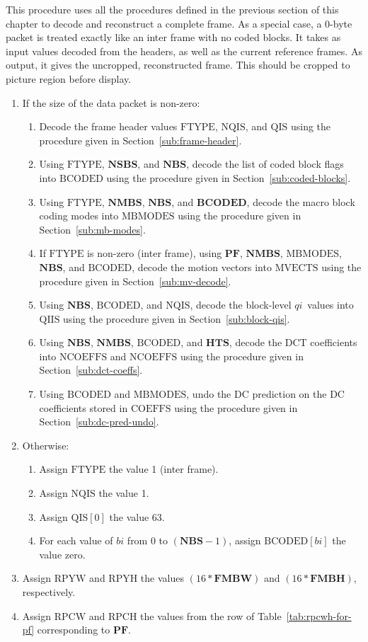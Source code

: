 \documentclass[9pt,letterpaper]{book}
\newcommand{\idx}[1]{{\ensuremath{\mathit{#1}}}}
\newcommand{\qi}{\idx{qi}}
\newcommand{\bi}{\idx{bi}}
\newcommand{\bitvar}[1]{\ensuremath{\mathbf{\bm{#1}}}}
\newcommand{\locvar}[1]{\ensuremath{\mathrm{#1}}}
\numberwithin{equation}{chapter}
\numberwithin{figure}{chapter}
\numberwithin{table}{chapter}
\begin{document}
This procedure uses all the procedures defined in the previous section of this
 chapter to decode and reconstruct a complete frame.
As a special case, a 0-byte packet is treated exactly like an inter frame with
 no coded blocks.
It takes as input values decoded from the headers, as well as the current
 reference frames.
As output, it gives the uncropped, reconstructed frame.
This should be cropped to picture region before display.

\begin{enumerate}
\item
If the size of the data packet is non-zero:
\begin{enumerate}
\item
Decode the frame header values \locvar{FTYPE}, \locvar{NQIS}, and \locvar{QIS}
 using the procedure given in Section~\ref{sub:frame-header}.
\item
Using \locvar{FTYPE}, \bitvar{NSBS}, and \bitvar{NBS}, decode the list of coded
 block flags into \locvar{BCODED} using the procedure given in
 Section~\ref{sub:coded-blocks}.
\item
Using \locvar{FTYPE}, \bitvar{NMBS}, \bitvar{NBS}, and \bitvar{BCODED}, decode
 the macro block coding modes into \locvar{MBMODES} using the procedure given
 in Section~\ref{sub:mb-modes}.
\item
If \locvar{FTYPE} is non-zero (inter frame), using \bitvar{PF}, \bitvar{NMBS},
 \locvar{MBMODES}, \bitvar{NBS}, and \locvar{BCODED}, decode the motion vectors
 into \locvar{MVECTS} using the procedure given in Section~\ref{sub:mv-decode}.
\item
Using \bitvar{NBS}, \locvar{BCODED}, and \locvar{NQIS}, decode the block-level
 \qi\ values into \locvar{QIIS} using the procedure given in
 Section~\ref{sub:block-qis}.
\item
Using \bitvar{NBS}, \bitvar{NMBS}, \locvar{BCODED}, and \bitvar{HTS}, decode
 the DCT coefficients into \locvar{NCOEFFS} and \locvar{NCOEFFS} using the
 procedure given in Section~\ref{sub:dct-coeffs}.
\item
Using \locvar{BCODED} and \locvar{MBMODES}, undo the DC prediction on the DC
 coefficients stored in \locvar{COEFFS} using the procedure given in
 Section~\ref{sub:dc-pred-undo}.
\end{enumerate}
\item
Otherwise:
\begin{enumerate}
\item
Assign \locvar{FTYPE} the value 1 (inter frame).
\item
Assign \locvar{NQIS} the value 1.
\item
Assign $\locvar{QIS}[0]$ the value 63.
\item
For each value of \locvar{\bi} from 0 to $(\bitvar{NBS}-1)$, assign
 $\locvar{BCODED}[\locvar{\bi}]$ the value zero.
\end{enumerate}
\item
Assign \locvar{RPYW} and \locvar{RPYH} the values $(16*\bitvar{FMBW})$ and
 $(16*\bitvar{FMBH})$, respectively.
\item
Assign \locvar{RPCW} and \locvar{RPCH} the values from the row of
 Table~\ref{tab:rpcwh-for-pf} corresponding to \bitvar{PF}.


\end{enumerate}
\end{document}
